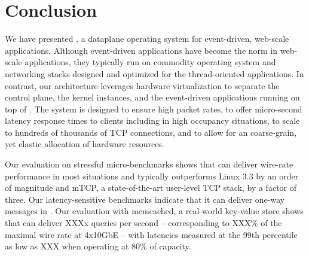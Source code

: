 
\section{Conclusion}

We have presented \ix, a dataplane operating system for event-driven,
web-scale applications.  Although event-driven applications have
become the norm in web-scale applications, they typically run on
commodity operating system and networking stacks designed and
optimized for the thread-oriented applications.  In contrast, our
architecture leverages hardware virtualization to separate the control
plane, the \ix kernel instances, and the event-driven applications
running on top of \ix.  The system is designed to ensure high packet
rates, to offer micro-second latency response times to clients
including in high occupancy situations, to scale to hundreds of
thousands of TCP connections, and to allow for an coarse-grain, yet
elastic allocation of hardware resources.

Our evaluation on stressful micro-benchmarks shows that \ix can
deliver wire-rate performance in most situations and typically
outperforms Linux 3.3 by an order of magnitude and mTCP, a
state-of-the-art user-level TCP stack, by a factor of three.  Our
latency-sensitive benchmarks indicate that it can deliver one-way
messages in \microsecond.  Our evaluation with memcached, a
real-world key-value store shows that \ix can deliver XXXx queries per
second -- corresponding to XXX\% of the maximal wire rate at 4x10GbE -- with
latencies measured at the 99th percentile as low as XXX when operating
at 80\% of capacity. 


